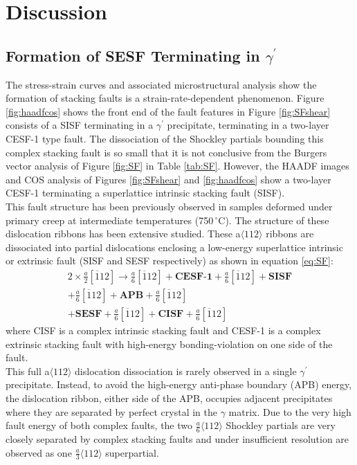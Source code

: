 \documentclass[a4paper,12pt,times,numbered,print,index]{Classes/PhDThesisPSnPDF}
\begin{document}
\section*{Discussion}
\subsection*{Formation of SESF Terminating in \texorpdfstring{$\gamma^\prime$}{Precipitate}}
The stress-strain curves and associated microstructural analysis show the formation of stacking faults is a strain-rate-dependent phenomenon. Figure \ref{fig:haadfcos} shows the front end of the fault features in Figure \ref{fig:SFshear} consists of a SISF terminating in a $\gamma^\prime$ precipitate, terminating in a two-layer CESF-1 type fault. The dissociation of the Shockley partials bounding this complex stacking fault is so small that it is not conclusive from the Burgers vector analysis of Figure \ref{fig:SF} in Table \ref{tab:SF}. However, the HAADF images and COS analysis of Figures \ref{fig:SFshear} and \ref{fig:haadfcos} show a two-layer CESF-1 terminating a superlattice intrinsic stacking fault (SISF).\\
This fault structure has been previously observed in samples deformed under primary creep at intermediate temperatures (750\,$^\circ$C). The structure of these dislocation ribbons has been extensive studied. These a$\langle112\rangle$ ribbons are dissociated into partial dislocations enclosing a low-energy superlattice intrinsic or extrinsic fault (SISF and SESF respectively) as shown in equation \ref{eq:SF}:
\begin{multline}
2 \times \frac{a}{2}[\overline{1}12] \rightarrow \frac{a}{6}[\overline{1}12] + \textbf{CESF-1} + \frac{a}{6}[\overline{1}12] + \textbf{SISF}\\
+ \frac{a}{6}[\overline{1}12] + \textbf{APB} + \frac{a}{6}[\overline{1}12] \\+ \textbf{SESF}
+ \frac{a}{6}[\overline{1}12] + \textbf{CISF} + \frac{a}{6}[\overline{1}12]
\label{eq:SF}
\end{multline}
where CISF is a complex intrinsic stacking fault and CESF-1 is a complex extrinsic stacking fault with high-energy bonding-violation on one side of the fault.\\
This full a$\langle112\rangle$ dislocation dissociation is rarely observed in a single $\gamma^\prime$ precipitate. Instead, to avoid the high-energy anti-phase boundary (APB) energy, the dislocation ribbon, either side of the APB, occupies adjacent precipitates where they are separated by perfect crystal in the $\gamma$ matrix. Due to the very high fault energy of both complex faults, the two $\frac{a}{6}\langle112\rangle$ Shockley partials are very closely separated by complex stacking faults and under insufficient resolution are observed as one $\frac{a}{3}\langle112\rangle$ superpartial.\cite{}\\
\end{document}
